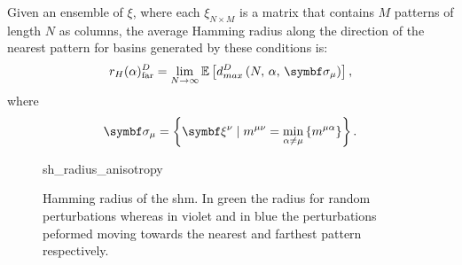 \documentclass[\rootdir/main.tex]{subfiles}
\begin{document}
\begin{definition}
    Given an ensemble of $\xi$, where each $\xi_{N \times M}$ is
    a matrix that contains $M$ patterns of length $N$ as columns, the average Hamming radius along the direction of the nearest pattern for basins generated by these conditions is:
    \begin{equation}
        r_{H}(\alpha)_{\text{far}}^{{D}} = \lim_{N \to \infty} \mathbb{E} \left[ d_{max}^{{D}} \left( N, \, \alpha, \, \bsigma_\mu \right) \right], 
    \end{equation}
    where
    \begin{equation*}
        \bsigma_{\mu} = \left\{ \bxi[\nu] \mid m^{\mu \nu} = \min_{\alpha \neq \mu}\left\{ m^{\mu \alpha} \right\} \right\}.
    \end{equation*}
\end{definition}

\begin{figure}[hbt]
    \centering
    {sh_radius_anisotropy}
    \caption{Hamming radius of the \acrshort{shm}. In green the radius for random perturbations whereas in violet and in blue the perturbations peformed moving towards the nearest and farthest pattern respectively.}
    \label{fig:sh:radius:anisotropy}
\end{figure}
\end{document}
